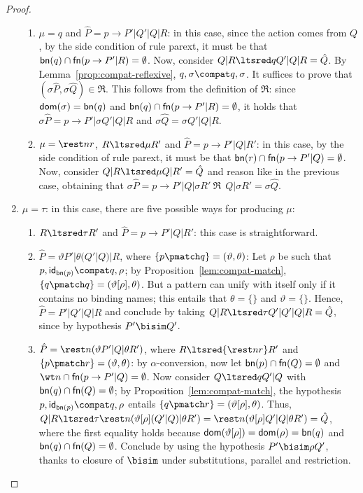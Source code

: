 \documentclass{LMCS}
\begin{document}
\begin{proof}
\begin{enumerate}
\begin{enumerate}[label=\({\alph*}]
	\item $\mu = q$ and $\hat P = p \to P'|Q'|Q|R$: in this case, since the action comes from $Q$,
	by the side condition of rule {\sf parext}, it must be that ${\sf bn}(q) \cap {\sf fn}(p \to P'|R) = \emptyset$. 
	Now, consider $Q|R \ltsred q Q'|Q|R = \hat Q$. By Lemma~\ref{prop:compat-reflexive},
	$q,\sigma \compat q,\sigma$. It suffices to prove that $(\sigma \hat P, \sigma \hat Q) \in \Re$. 
	This follows from the definition of $\Re$: 
	since ${\sf dom}(\sigma) = {\sf bn}(q)$ and ${\sf bn}(q) \cap {\sf fn}(p \to P'|R) = \emptyset$, it holds that
	$\sigma \hat P = p \to P'|\sigma Q'|Q|R$ and $\sigma \hat Q = \sigma Q'|Q|R$.

	\item $\mu = \rest n r$, $R \ltsred\mu R'$ and $\hat P = p \to P'|Q|R'$: in this case, 
	by the side condition of rule {\sf parext}, it must be that ${\sf bn}(r) \cap {\sf fn}(p \to P'|Q) = \emptyset$. 
	Now, consider $Q|R \ltsred \mu Q|R' = \hat Q$ and reason like in the previous case, obtaining that
	$\sigma \hat P = p \to P'|Q|\sigma R'\ \Re\ \ Q|\sigma R' = \sigma \hat Q$.
	\end{enumerate}

\item $\mu = \tau$: in this case, there are five possible ways for producing $\mu$:
	\begin{enumerate}[label=\({\alph*}]
	\item $R \ltsred\tau R'$ and $\hat P = p \to P'|Q|R'$: this case is straightforward.

	\item $\hat P = \vartheta P'|\theta (Q'|Q)|R$, where $\{p\pmatch q\} = (\vartheta,\theta)$:
	Let $\rho$ be such that $p,{\sf id}_{{\sf bn}(p)}\compat q,\rho$; by Proposition~\ref{lem:compat-match},
	$\{q\pmatch q\} = (\vartheta[\rho],\theta)$. But a pattern can unify with itself only if it
    contains no binding names;
    this entails that $\theta = \{\}$ and $\vartheta = \{\}$.
	Hence, $\hat P = P'| Q'|Q |R$ and conclude by
	taking $Q|R \ltsred\tau Q'|Q'|Q|R = \hat Q$, since by hypothesis $P' \bisim Q'$.

	\item $\hat P = \rest n(\vartheta P'|Q|\theta R')$, where $R \ltsred{\rest n r} R'$ and 
	$\{p\pmatch r\} = (\vartheta,\theta)$: by $\alpha$-conversion, now let ${\sf bn}(p) \cap {\sf fn}(Q) = \emptyset$
	and $\wt n \cap {\sf fn}(p \to P'|Q) = \emptyset$. Now consider $Q \ltsred q Q'|Q$ with 
	${\sf bn}(q) \cap {\sf fn}(Q) = \emptyset$; by Proposition~\ref{lem:compat-match}, the hypothesis
	$p,{\sf id}_{{\sf bn}(p)}\compat q,\rho$ entails $\{q\pmatch r\} = (\vartheta[\rho],\theta)$. 
	Thus, $Q|R \ltsred\tau \rest n(\vartheta[\rho](Q'|Q)|\theta R') = \rest n(\vartheta[\rho]Q'|Q|\theta R') = \hat Q$,
	where the first equality holds because ${\sf dom}(\vartheta[\rho]) = {\sf dom}(\rho) = {\sf bn}(q)$ 
	and ${\sf bn}(q) \cap {\sf fn}(Q) = \emptyset$. Conclude by using the hypothesis $P' \bisim \rho Q'$,
	thanks to closure of $\bisim$ under substitutions, parallel and restriction.


\end{enumerate}
\end{enumerate}
\end{proof}
\end{document}
